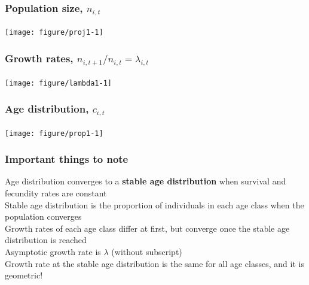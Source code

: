 \documentclass[color=usenames,dvipsnames]{beamer}\usepackage[]{graphicx}\usepackage[]{color}
\begin{document}
\begin{frame}[fragile]
  \frametitle{Population size, $n_{i,t}$}

\vspace{-0.9cm}
\begin{center}
  \texttt{[image: figure/proj1-1]}
\end{center}
\end{frame}




\begin{frame}[fragile]
  \frametitle{Growth rates, $n_{i,t+1}/n_{i,t} = \lambda_{i,t}$}

\vspace{-0.9cm}
\begin{center}
  \texttt{[image: figure/lambda1-1]}
\end{center}
\end{frame}




\begin{frame}[fragile]
  \frametitle{Age distribution, $c_{i,t}$}

\vspace{-0.9cm}
\begin{center}
  \texttt{[image: figure/prop1-1]}
\end{center}
\end{frame}









\begin{frame}
  \frametitle{Important things to note}
  \large
  Age distribution converges to a {\bf stable age
    distribution} when survival and fecundity rates are constant \\
  \pause
  \vfill
  Stable age distribution is the proportion of individuals in each age
  class when the population converges \\
  \pause
  \vfill
  Growth rates of each age class differ at first, but converge
  once the stable age distribution is reached \\
  \pause
  \vfill
  Asymptotic growth rate is $\lambda$ (without subscript) \\
  Growth rate at the stable age distribution is the same for
  all age classes, and it is geometric! \\
\end{frame}
\end{document}
